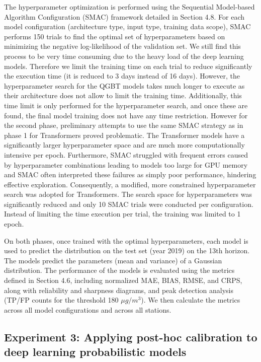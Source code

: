 \documentclass[12pt,a4paper]{book}
\begin{document}
The hyperparameter optimization is performed using the Sequential Model-based Algorithm Configuration (SMAC) framework detailed in Section 4.8. For each model configuration (architecture type, input type, training data scope), SMAC performs 150 trials to find the optimal set of hyperparameters based on minimizing the negative log-likelihood of the validation set. We still find this process to be very time consuming due to the heavy load of the deep learning models. Therefore we limit the training time on each trial to reduce significantly the execution time (it is reduced to 3 days instead of 16 days). However, the hyperparameter search for the QGBT models takes much longer to execute as their architecture does not allow to limit the training time. Additionally, this time limit is only performed for the hyperparameter search, and once these are found, the final model training does not have any time restriction.  However for the second phase, preliminary attempts to use the same SMAC strategy as in phase 1 for Transformers proved problematic. The Transformer models have a significantly larger hyperparameter space and are much more computationally intensive per epoch. Furthermore, SMAC struggled with frequent errors caused by hyperparameter combinations leading to models too large for GPU memory and SMAC often interpreted these failures as simply poor performance, hindering effective exploration. Consequently, a modified, more constrained hyperparameter search was adopted for Transformers. The search space for hyperparameters was significantly reduced and only 10 SMAC trials were conducted per configuration. Instead of limiting the time execution per trial, the training was limited to 1 epoch. 

On both phases, once trained with the optimal hyperparameters, each model is used to predict the \no{} distribution on the test set (year 2019) on the 13th horizon. The models predict the parameters (mean and variance) of a Gaussian distribution. The performance of the models is evaluated using the metrics defined in Section 4.6, including normalized MAE, BIAS, RMSE, and CRPS, along with reliability and sharpness diagrams, and peak detection analysis (TP/FP counts for the threshold 180 $\mu g/m^3$). We then calculate the metrics across all model configurations and across all stations. 

\subsection{Experiment 3: Applying post-hoc calibration to deep learning probabilistic models}
\end{document}
